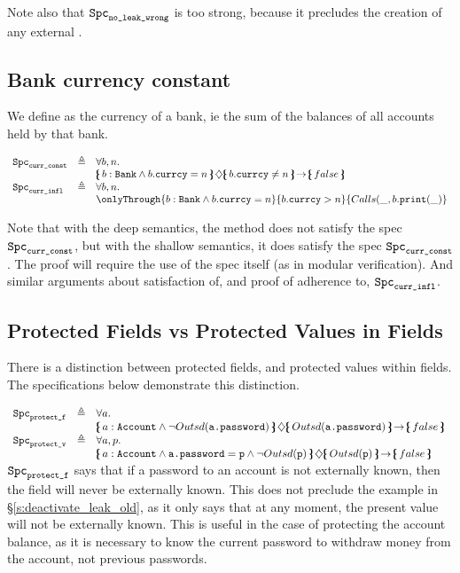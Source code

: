 \noindent
Note also that
 ${\texttt{Spc}}_{{\texttt{no\_leak\_wrong}}} $ is too strong, because it precludes the creation of any external  .
 
 \subsection{Bank currency constant}
 
 We define as  the currency of a bank, ie the sum of the balances of all accounts held by that bank.
 
 $\begin{array}{lll}
 \Spec{curr\_const} & \triangleq &  \forall b,n.\\
 & &   \onlyIf{b:\prg{Bank}\wedge b.\prg{currcy}=n}{b.\prg{currcy}\neq n} {false}\   
 \\
  \Spec{curr\_infl} & \triangleq &  \forall b,n.\\
 & &   \onlyThrough{b:\prg{Bank}\wedge b.\prg{currcy}=n}{b.\prg{currcy}> n} {\calls{\_}{b}{\prg{print}}{\_} }   
\end{array}
$
 
 Note that with the deep semantics, the method   does not satisfy the spec $ {\texttt{Spc}}_{{\texttt{curr\_const}}}$, but with the shallow semantics, it does satisfy the spec $ {\texttt{Spc}}_{{\texttt{curr\_const}}}$. The proof will require the use of the spec itself (as in modular verification). And similar arguments about satisfaction of,  and proof of  adherence to, ${\texttt{Spc}}_{{\texttt{curr\_infl}}}$.
 
\subsection{Protected Fields vs Protected Values in Fields}

There is a distinction between protected fields, and protected values within fields. 
The specifications below demonstrate this distinction.
 
 $\begin{array}{lll}
 \Spec{protect\_f} & \triangleq &  \forall a.\\
 & &   \onlyIf{a:\prg{Account}\wedge \neg \outside{\prg{a.password}}}
 					{\outside{\prg{a.password}}} 
 					{false}\   
 \\
 \Spec{protect\_v} & \triangleq &  \forall a, p.\\
 & &   \onlyIf{a:\prg{Account}\wedge \prg{a.password} = \prg{p} \wedge \neg \outside{\prg{p}}}
 					{\outside{\prg{p}}} 
 					{false}\    
\end{array}
$
${\texttt{Spc}}_{{\texttt{protect\_f}}}$ says that if a password to an account is not externally known, then 
the field will never be externally known. This does not preclude the example in \S \ref{s:deactivate_leak_old}, as it only says that at any moment, the present value will not be externally known. This is useful in the case of protecting the account balance, as it is necessary to know the current password to withdraw money from the account, not previous passwords.

